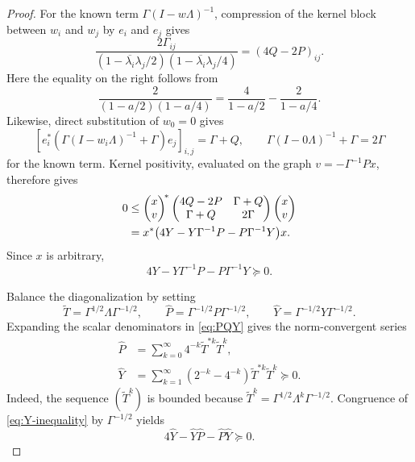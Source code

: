 \documentclass[preprints,article,submit,oneauthor]{Definitions/mdpi}
\theoremstyle{mdpi}
\theoremstyle{definition}
\begin{document}
\begin{proof}
For the known term $\Gamma(I-w\Lambda)^{-1}$, compression of the
kernel block between $w_i$ and $w_j$ by $e_i$ and $e_j$ gives
\begin{equation}
  \frac{2\Gamma_{ij}}
  {(1-\overline{\lambda_i}\lambda_j/2)
   (1-\overline{\lambda_i}\lambda_j/4)}
  =(4Q-2P)_{ij}.
  \label{eq:main-sampled-block}
\end{equation}
Here the equality on the right follows from
\[
  \frac{2}{(1-a/2)(1-a/4)}
  =\frac4{1-a/2}-\frac2{1-a/4}.
\]
Likewise, direct substitution of $w_0=0$ gives
\begin{equation}
  \left[e_i^*\left(
  \Gamma(I-w_i\Lambda)^{-1}+\Gamma\right)e_j\right]_{i,j}
  =\Gamma+Q,
  \qquad
  \Gamma(I-0\Lambda)^{-1}+\Gamma=2\Gamma
  \label{eq:origin-blocks}
\end{equation}
for the known term.  Kernel positivity, evaluated on the graph
$v=-\Gamma^{-1}Px$, therefore gives
\begin{align}
  0&\leq
  \begin{pmatrix}x\\v\end{pmatrix}^{\!*}
  \begin{pmatrix}
    4Q-2P&\Gamma+Q\\
    \Gamma+Q&2\Gamma
  \end{pmatrix}
  \begin{pmatrix}x\\v\end{pmatrix} \notag\\
  &=x^*\bigl(4Y-Y\Gamma^{-1}P-P\Gamma^{-1}Y\bigr)x.
  \label{eq:Y-inequality-form}
\end{align}
Since $x$ is arbitrary,
\begin{equation}
  4Y-Y\Gamma^{-1}P-P\Gamma^{-1}Y\succeq0.
  \label{eq:Y-inequality}
\end{equation}

Balance the diagonalization by setting
\begin{equation}
  \widetilde T=\Gamma^{1/2}\Lambda\Gamma^{-1/2},
  \qquad
  \widehat P=\Gamma^{-1/2}P\Gamma^{-1/2},
  \qquad
  \widehat Y=\Gamma^{-1/2}Y\Gamma^{-1/2}.
  \label{eq:balanced-objects}
\end{equation}
Expanding the scalar denominators in \eqref{eq:PQY} gives the
norm-convergent series
\begin{align}
  \widehat P
  &=\sum_{k=0}^{\infty}4^{-k}\widetilde T^{*k}\widetilde T^k,
  \label{eq:P-series}\\
  \widehat Y
  &=\sum_{k=1}^{\infty}(2^{-k}-4^{-k})
  \widetilde T^{*k}\widetilde T^k\succeq0.
  \label{eq:Y-series}
\end{align}
Indeed, the sequence $(\widetilde T^k)$ is bounded because
$\widetilde T^k=\Gamma^{1/2}\Lambda^k\Gamma^{-1/2}$.
Congruence of \eqref{eq:Y-inequality} by $\Gamma^{-1/2}$ yields
\begin{equation}
  4\widehat Y-\widehat Y\widehat P-
  \widehat P\widehat Y\succeq0.
  \label{eq:balanced-inequality}
\end{equation}


\end{proof}
\end{document}

